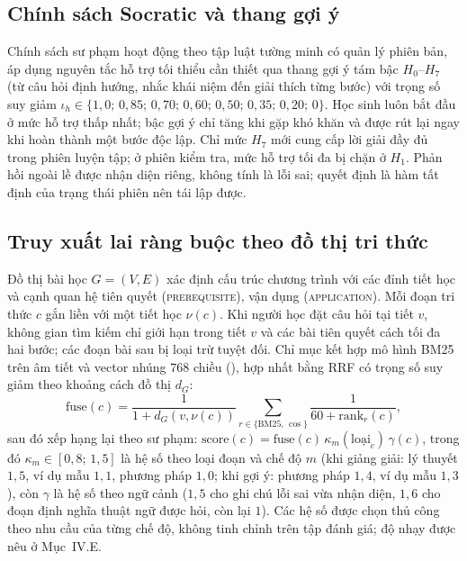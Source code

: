 \documentclass[10pt,a4paper,twocolumn]{article}
\begin{document}
\subsection{Chính sách Socratic và thang gợi ý}
Chính sách sư phạm hoạt động theo tập luật tường minh có quản lý phiên bản, áp dụng nguyên tắc hỗ trợ tối thiểu cần thiết qua thang gợi ý tám bậc $H_0$--$H_7$ (từ câu hỏi định hướng, nhắc khái niệm đến giải thích từng bước) với trọng số suy giảm $\iota_h \in \{1{,}0;\,0{,}85;\,0{,}70;\,0{,}60;\,0{,}50;\,0{,}35;\,0{,}20;\,0\}$. Học sinh luôn bắt đầu ở mức hỗ trợ thấp nhất; bậc gợi ý chỉ tăng khi gặp khó khăn và được rút lại ngay khi hoàn thành một bước độc lập. Chỉ mức $H_7$ mới cung cấp lời giải đầy đủ trong phiên luyện tập; ở phiên kiểm tra, mức hỗ trợ tối đa bị chặn ở $H_1$. Phản hồi ngoài lề được nhận diện riêng, không tính là lỗi sai; quyết định là hàm tất định của trạng thái phiên nên tái lập được.

\subsection{Truy xuất lai ràng buộc theo đồ thị tri thức}
Đồ thị bài học $G=(V,E)$ xác định cấu trúc chương trình với các đỉnh tiết học và cạnh quan hệ tiên quyết (\textsc{prerequisite}), vận dụng (\textsc{application}). Mỗi đoạn tri thức $c$ gắn liền với một tiết học $\nu(c)$. Khi người học đặt câu hỏi tại tiết $v$, không gian tìm kiếm chỉ giới hạn trong tiết $v$ và các bài tiên quyết cách tối đa hai bước; các đoạn bài sau bị loại trừ tuyệt đối. Chỉ mục kết hợp mô hình BM25 trên âm tiết và vector nhúng $768$ chiều (), hợp nhất bằng RRF có trọng số suy giảm theo khoảng cách đồ thị $d_G$:
\begin{equation}
\mathrm{fuse}(c)=\frac{1}{1+d_G(v,\nu(c))}\sum_{r\in\{\mathrm{BM25},\,\cos\}}\frac{1}{60+\mathrm{rank}_r(c)},
\label{eq:fuse}
\end{equation}
sau đó xếp hạng lại theo sư phạm: $\mathrm{score}(c)=\mathrm{fuse}(c)\,\kappa_{m}(\text{loại}_c)\,\gamma(c)$, trong đó $\kappa_m\in[0{,}8;\,1{,}5]$ là hệ số theo loại đoạn và chế độ $m$ (khi giảng giải: lý thuyết $1{,}5$, ví dụ mẫu $1{,}1$, phương pháp $1{,}0$; khi gợi ý: phương pháp $1{,}4$, ví dụ mẫu $1{,}3$), còn $\gamma$ là hệ số theo ngữ cảnh ($1{,}5$ cho ghi chú lỗi sai vừa nhận diện, $1{,}6$ cho đoạn định nghĩa thuật ngữ được hỏi, còn lại $1$). Các hệ số được chọn thủ công theo nhu cầu của từng chế độ, không tinh chỉnh trên tập đánh giá; độ nhạy được nêu ở Mục~IV.E.
\end{document}
